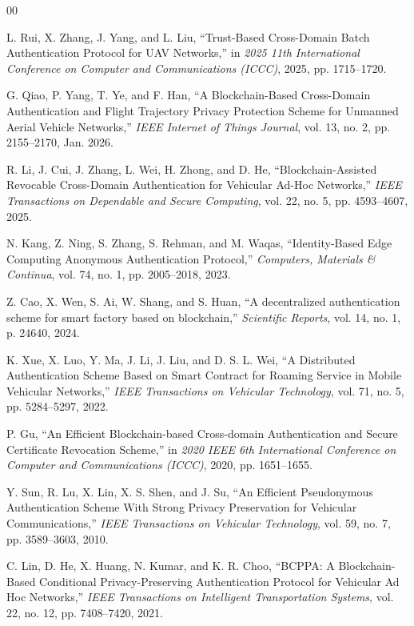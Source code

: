 \documentclass[lettersize,journal]{IEEEtran}
\begin{document}
	\begin{thebibliography}{00}
		
		 L. Rui, X. Zhang, J. Yang, and L. Liu, ``Trust-Based Cross-Domain Batch Authentication Protocol for UAV Networks,'' in \emph{2025 11th International Conference on Computer and Communications (ICCC)}, 2025, pp. 1715--1720.
		
		 G. Qiao, P. Yang, T. Ye, and F. Han, ``A Blockchain-Based Cross-Domain Authentication and Flight Trajectory Privacy Protection Scheme for Unmanned Aerial Vehicle Networks,'' \emph{IEEE Internet of Things Journal}, vol. 13, no. 2, pp. 2155--2170, Jan. 2026.
		
		 R. Li, J. Cui, J. Zhang, L. Wei, H. Zhong, and D. He, ``Blockchain-Assisted Revocable Cross-Domain Authentication for Vehicular Ad-Hoc Networks,'' \emph{IEEE Transactions on Dependable and Secure Computing}, vol. 22, no. 5, pp. 4593--4607, 2025.
		
		 N. Kang, Z. Ning, S. Zhang, S. Rehman, and M. Waqas, ``Identity-Based Edge Computing Anonymous Authentication Protocol,'' \emph{Computers, Materials \& Continua}, vol. 74, no. 1, pp. 2005--2018, 2023.
		
		 Z. Cao, X. Wen, S. Ai, W. Shang, and S. Huan, ``A decentralized authentication scheme for smart factory based on blockchain,'' \emph{Scientific Reports}, vol. 14, no. 1, p. 24640, 2024.
		
		 K. Xue, X. Luo, Y. Ma, J. Li, J. Liu, and D. S. L. Wei, ``A Distributed Authentication Scheme Based on Smart Contract for Roaming Service in Mobile Vehicular Networks,'' \emph{IEEE Transactions on Vehicular Technology}, vol. 71, no. 5, pp. 5284--5297, 2022.
		
		 P. Gu, ``An Efficient Blockchain-based Cross-domain Authentication and Secure Certificate Revocation Scheme,'' in \emph{2020 IEEE 6th International Conference on Computer and Communications (ICCC)}, 2020, pp. 1651--1655.
		
		 Y. Sun, R. Lu, X. Lin, X. S. Shen, and J. Su, ``An Efficient Pseudonymous Authentication Scheme With Strong Privacy Preservation for Vehicular Communications,'' \emph{IEEE Transactions on Vehicular Technology}, vol. 59, no. 7, pp. 3589--3603, 2010.
		
		 C. Lin, D. He, X. Huang, N. Kumar, and K. R. Choo, ``BCPPA: A Blockchain-Based Conditional Privacy-Preserving Authentication Protocol for Vehicular Ad Hoc Networks,'' \emph{IEEE Transactions on Intelligent Transportation Systems}, vol. 22, no. 12, pp. 7408--7420, 2021.
		

\end{thebibliography}
\end{document}
